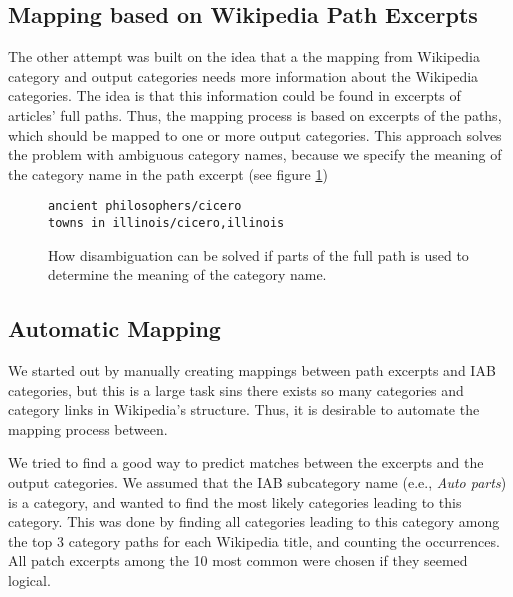 \subsection{Mapping based on Wikipedia Path Excerpts}
\label{sec:mapping_based_on_wikipedia_path_excerpts}
The other attempt was built on the idea that a the mapping from Wikipedia category and output categories needs more information about the Wikipedia categories. The idea is that this information could be found in excerpts of articles' full paths. Thus, the mapping process is based on excerpts of the paths, which should be mapped to one or more output categories. This approach solves the problem with ambiguous category names, because we specify the meaning of the category name in the path excerpt (see figure \ref{fig:solving_disambiguation})

\begin{figure}
\centering
\begin{lstlisting}
ancient philosophers/cicero
towns in illinois/cicero,illinois
\end{lstlisting}
\caption[Avoiding disambiguation with excerpts of category paths]{How disambiguation can be solved if parts of the full path is used to determine the meaning of the category name.}
\label{fig:solving_disambiguation}
\end{figure}

\subsection{Automatic Mapping}
We started out by manually creating mappings between path excerpts and IAB categories, but this is a large task sins there exists so many categories and category links in Wikipedia's structure. Thus, it is desirable to automate the mapping process between.

We tried to find a good way to predict matches between the excerpts and the output categories. We assumed that the IAB subcategory name (e.e., \emph{Auto parts}) is a category, and wanted to find the most likely categories leading to this category. This was done by finding all categories leading to this category among the top 3 category paths for each Wikipedia title, and counting the occurrences. All patch excerpts among the 10 most common were chosen if they seemed logical. 




